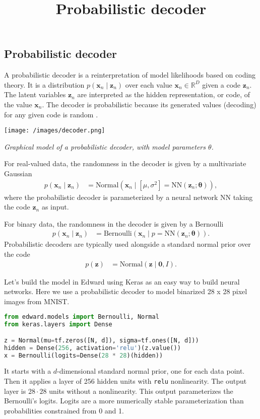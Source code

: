 \title{Probabilistic decoder}

\subsection{Probabilistic decoder}

A probabilistic decoder is a reinterpretation of model likelihoods
based on coding theory. It is a distribution $p(\mathbf{x}_n\mid \mathbf{z}_n)$  over each value
$\mathbf{x}_n\in\mathbb{R}^D$ given a code $\mathbf{z}_n$. The latent
variables $\mathbf{z}_n$ are interpreted as the hidden representation, or code, of the value
$\mathbf{x}_n$. The decoder is probabilistic because its generated
values (decoding) for any given code is random
\citep{dayan1995helmholtz}.

\texttt{[image: /images/decoder.png]}

{\small\textit{Graphical model of a probabilistic decoder, with model
parameters $\theta$.}}

For real-valued data,
the randomness in the decoder is given by a multivariate Gaussian
\begin{align*}
  p(\mathbf{x}_n\mid\mathbf{z}_n)
  &=
  \text{Normal}(\mathbf{x}_n\mid [\mu,\sigma^2]=\mathrm{NN}(\mathbf{z}_n; \mathbf{\theta})),
\end{align*}
where the probabilistic decoder is parameterized by a neural network
$\mathrm{NN}$ taking the code $\mathbf{z}_n$ as input.

For binary data,
the randomness in the decoder is given by a Bernoulli
\begin{align*}
  p(\mathbf{x}_n\mid\mathbf{z}_n)
  &=
  \text{Bernoulli}(\mathbf{x}_n\mid p=\mathrm{NN}(\mathbf{z}_n; \mathbf{\theta})).
\end{align*}
Probabilistic decoders are typically used alongside a standard normal
prior over the code
\begin{align*}
  p(\mathbf{z})
  &=
  \text{Normal}(\mathbf{z} \mid \mathbf{0}, I).
\end{align*}

Let's build the model in Edward using
Keras as an easy way to build neural networks. Here we use a
probabilistic decoder to model binarized 28 x 28
pixel images from MNIST.
\begin{lstlisting}[language=Python]
from edward.models import Bernoulli, Normal
from keras.layers import Dense

z = Normal(mu=tf.zeros([N, d]), sigma=tf.ones([N, d]))
hidden = Dense(256, activation='relu')(z.value())
x = Bernoulli(logits=Dense(28 * 28)(hidden))
\end{lstlisting}
It starts with a $d$-dimensional standard normal prior, one for each
data point. Then it applies a layer of 256 hidden units with
\texttt{relu} nonlinearity. The output layer is $28\cdot 28$ units
without a nonlinearity. This output
parameterizes the Bernoulli's logits. Logits are a more numerically stable
parameterization than probabilities constrained
from 0 and 1.

